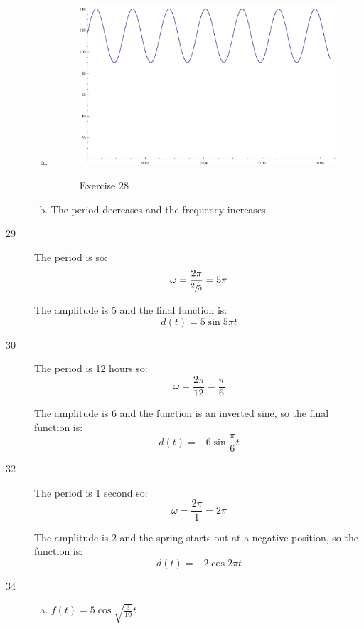 \documentclass{exam}
\begin{document}
\begin{description}
\begin{enumerate}[(a)]
          \item 
            \begin{figure}[H]
              \centering
              \includegraphics[scale=0.6]{exercise28.eps}

              Exercise 28
            \end{figure}

          \item The period decreases and the frequency increases.

        \end{enumerate}

      \item[29] The period is  so: 
        \[
        \omega = \frac{2 \pi}{\sfrac{2}{5}} = 5 \pi
        \]

        The amplitude is 5 and the final function is:
        \[
          \boxed{ d(t) = 5 \sin 5 \pi t }
        \]

      \item[30] The period is 12 hours so: 
        \[
          \omega = \frac{2 \pi}{12} = \frac{\pi}{6}
        \]

        The amplitude is 6 and the function is an inverted sine, so the final function is:
        \[
          \boxed{ d(t) = -6 \sin \frac{\pi}{6} t }
        \]

      \item[32] The period is 1 second so: 
        \[
          \omega = \frac{2 \pi}{1} = 2 \pi
        \]

        The amplitude is 2 and the spring starts out at a negative position, so the function is:
        \[
          \boxed{ d(t) = -2 \cos 2 \pi t }
        \]

      \item[34]
        \begin{enumerate}[(a)]
          \item $f(t) = 5 \cos \sqrt{\frac{3}{10}} t$


\end{enumerate}
\end{description}
\end{document}
